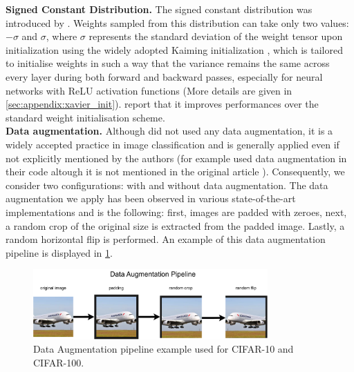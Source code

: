 \noindent\textbf{Signed Constant Distribution.} The signed constant
distribution was introduced by \cite{DBLP:conf/nips/ZhouLLY19}. Weights sampled
from this distribution can take only two values: $-\sigma$ and $\sigma$, where
$\sigma$ represents the standard deviation of the weight tensor upon
initialization using the widely adopted Kaiming initialization
\cite{DBLP:conf/iccv/HeZRS15}, which is tailored to initialise weights in such a
way that the variance remains the same across every layer during both forward
and backward passes, especially for neural networks with \ac{ReLU} activation
functions (More details are given in \cref{sec:appendix:xavier_init}).
\citeauthor{DBLP:conf/nips/ZhouLLY19} report that it improves performances over
the standard weight initialisation scheme.\\

\noindent\textbf{Data augmentation.} Although
\citeauthor{DBLP:conf/nips/ZhouLLY19} \cite{DBLP:conf/nips/ZhouLLY19} did not
used any data augmentation, it is a widely accepted practice in image
classification and is generally applied even if not explicitly mentioned by the
authors (for example \citeauthor{DBLP:conf/cvpr/RamanujanWKFR20} used data
augmentation in their code \cite{hidden-networks} altough it is not mentioned in
the original article \cite{DBLP:conf/cvpr/RamanujanWKFR20}). Consequently, we
consider two configurations: with and without data augmentation. The data
augmentation we apply has been observed in various state-of-the-art
implementations
\cite{hidden-networks,openlth_dataaugmentation,rethinking_dataaugmentatino} and
is the following: first, images are padded with zeroes, next, a random crop of
the original size is extracted from the padded image. Lastly, a random
horizontal flip is performed. An example of this data augmentation pipeline is
displayed in \cref{fig:chap2:data_augmentation_pipeline}.\\

\begin{figure}[h!]
  \centering
  \includegraphics[width=0.8\textwidth]{chapter_2/assets/data_augmentation_pipeline.pdf}
  \caption{Data Augmentation pipeline example used for CIFAR-10 and CIFAR-100.}
  \label{fig:chap2:data_augmentation_pipeline}
\end{figure}

